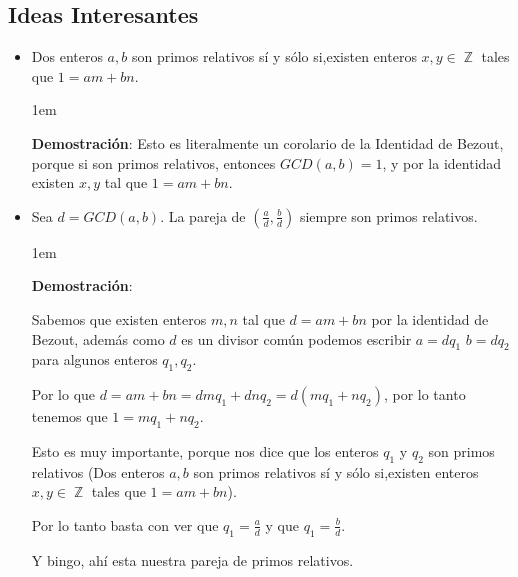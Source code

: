 \documentclass[12pt, fleqn]{report}                             %
\newenvironment{SmallIndentation}[1][0.75em]                    %
    {\begin{adjustwidth}{#1}{}\begin{footnotesize}}                 %
    {\end{footnotesize}\end{adjustwidth}}                           %
\DeclareMathOperator \Integers  {\mathbb{Z}}                     %
\begin{document}
        \subsection*{Ideas Interesantes}
            \begin{itemize}

                \item Dos enteros $a,b$ son primos relativos sí y sólo si,existen
                enteros $x,y \in \Integers$ tales que $1=am+bn$.

                    \begin{SmallIndentation}[1em]
                        \textbf{Demostración}:
                            Esto es literalmente un corolario de la Identidad de Bezout,
                            porque si son primos relativos, entonces $GCD(a,b)=1$, y por 
                            la identidad existen $x,y$ tal que $1=am+bn$.

                    \end{SmallIndentation} 


                \item Sea $d=GCD(a,b)$. La pareja de $(\frac{a}{d}, \frac{b}{d})$ siempre son
                primos relativos.

                    \begin{SmallIndentation}[1em]
                        \textbf{Demostración}:

                        Sabemos que existen enteros $m,n$ tal que $d = am+bn$ por la
                        identidad de Bezout, además como $d$ es un divisor común
                        podemos escribir $a=dq_1$ $b=dq_2$ para algunos enteros $q_1,q_2$.

                        Por lo que $d=am+bn = dmq_1 + dnq_2 = d(mq_1 +nq_2)$, por
                        lo tanto tenemos que $1= mq_1 + nq_2$.

                        Esto es muy importante, porque nos dice que los enteros $q_1$ y $q_2$
                        son primos relativos (Dos enteros $a,b$ son primos relativos sí y sólo
                        si,existen enteros $x,y \in \Integers$ tales que $1=am+bn$).

                        Por lo tanto basta con ver que $q_1=\frac{a}{d}$ y que $q_1=\frac{b}{d}$.

                        Y bingo, ahí esta nuestra pareja de primos relativos.

                    \end{SmallIndentation} 

            \end{itemize}
\end{document}
